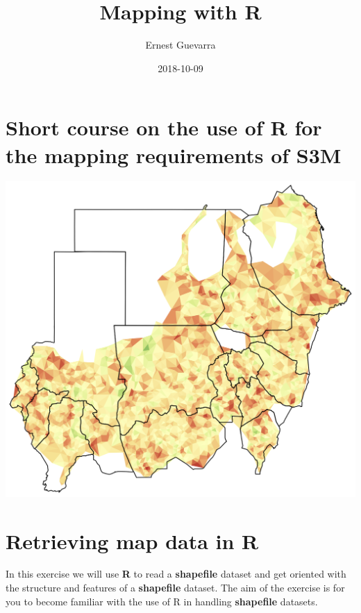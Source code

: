 \documentclass[12pt,a4paper,a4paper]{book}
\title{Mapping with R}
\author{Ernest Guevarra}
\date{2018-10-09}
\theoremstyle{definition}
\theoremstyle{definition}
\theoremstyle{definition}
\theoremstyle{remark}
\begin{document}
\maketitle

{
\hypersetup{linkcolor=black}
\setcounter{tocdepth}{1}
\tableofcontents
}
\listoftables
\listoffigures
\hypertarget{short-course-on-the-use-of-r-for-the-mapping-requirements-of-s3m}{%
\chapter*{Short course on the use of R for the mapping requirements of
S3M}\label{short-course-on-the-use-of-r-for-the-mapping-requirements-of-s3m}}

\begin{center}\includegraphics[width=18.75in]{figures/sudanMapTriSim} \end{center}

\hypertarget{exercise1}{%
\chapter{Retrieving map data in R}\label{exercise1}}

In this exercise we will use \textbf{R} to read a \textbf{shapefile}
dataset and get oriented with the structure and features of a
\textbf{shapefile} dataset. The aim of the exercise is for you to become
familiar with the use of R in handling \textbf{shapefile} datasets.
\end{document}
